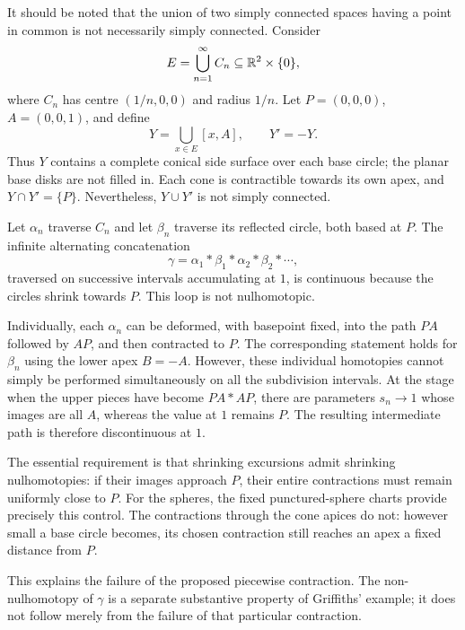 \documentclass[12pt,a4paper]{article}
\begin{document}
    \begin{remark}
        It should be noted that the union of two simply connected spaces having a point in common is not necessarily simply connected. Consider
        \[
            E=\bigcup_{n=1}^{\infty}C_n\subseteq\mathbb{R}^2\times\{0\},
        \]
        where $C_n$ has centre $(1/n,0,0)$ and radius $1/n$.
        Let $P=(0,0,0)$, $A=(0,0,1)$, and define
        \[
            Y=\bigcup_{x\in E}[x,A],\qquad Y'=-Y.
        \]
        Thus $Y$ contains a complete conical side surface over
        each base circle; the planar base disks are not filled in.
        Each cone is contractible towards its own apex, and
        $Y\cap Y'=\{P\}$. Nevertheless, $Y\cup Y'$ is not simply
        connected.
        
        Let $\alpha_n$ traverse $C_n$ and let $\beta_n$ traverse
        its reflected circle, both based at $P$. The infinite
        alternating concatenation
        \[
            \gamma=\alpha_1*\beta_1*\alpha_2*\beta_2*\cdots,
        \]
        traversed on successive intervals accumulating at $1$,
        is continuous because the circles shrink towards $P$.
        This loop is not nulhomotopic.
        
        Individually, each $\alpha_n$ can be deformed, with
        basepoint fixed, into the path $PA$ followed by $AP$,
        and then contracted to $P$. The corresponding statement
        holds for $\beta_n$ using the lower apex $B=-A$.
        However, these individual homotopies cannot simply be
        performed simultaneously on all the subdivision intervals.
        At the stage when the upper pieces have become $PA*AP$,
        there are parameters $s_n\to1$ whose images are all $A$,
        whereas the value at $1$ remains $P$. The resulting
        intermediate path is therefore discontinuous at $1$.
        
        The essential requirement is that shrinking excursions
        admit shrinking nulhomotopies: if their images approach
        $P$, their entire contractions must remain uniformly
        close to $P$. For the spheres, the fixed punctured-sphere
        charts provide precisely this control. The contractions
        through the cone apices do not: however small a base
        circle becomes, its chosen contraction still reaches
        an apex a fixed distance from $P$.
        
        This explains the failure of the proposed piecewise
        contraction. The non-nulhomotopy of $\gamma$ is a
        separate substantive property of Griffiths' example;
        it does not follow merely from the failure of that
        particular contraction.
    \end{remark}
    \bigskip
\end{document}
